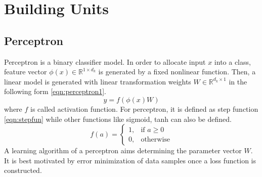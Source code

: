\section{Building Units}
\label{sec:building_units}
\subsection{Perceptron}
Perceptron is a binary classifier model. In order to allocate input $x$ into a class, feature vector $\phi(x) \in \mathbb{R}^{1 \times d_k}$ is generated by a fixed nonlinear function. Then, a linear model is generated with linear transformation weights $W \in \mathbb{R}^{d_k \times 1} $ in the following form \eqref{eqn:perceptron1}. \\
\begin{equation}
\label{eqn:perceptron1}
y = f(\phi(x) W)
\end{equation}
where $f$ is called activation function. For perceptron, it is defined as step function \eqref{eqn:stepfun} while other functions like sigmoid, tanh can also be defined. \\
\begin{equation}
\label{eqn:stepfun}
f(a) = 
\begin{cases}
1,   & \text{if } a\geq 0\\
0,   & \text{otherwise}
\end{cases} 
\end{equation}
A learning algorithm of a perceptron aims determining the parameter vector $W$. It is best motivated by error minimization of data samples once a loss function is constructed. \\
